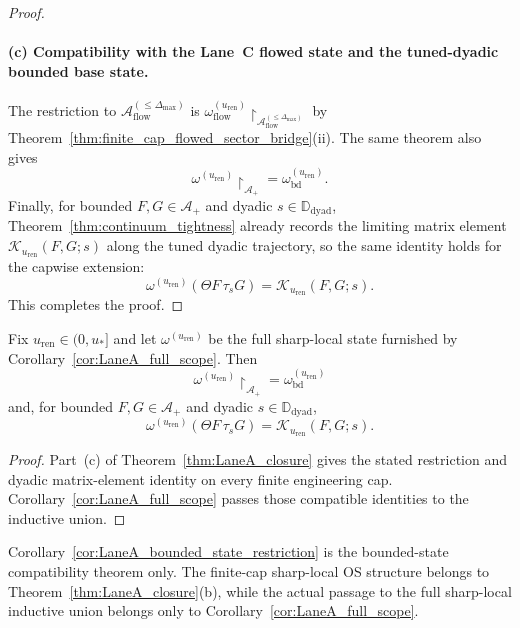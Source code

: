 \begin{proof}
\paragraph{(c) Compatibility with the Lane~C flowed state and the tuned-dyadic bounded base state.}
The restriction to $\mathcal A_{\mathrm{flow}}^{(\le \Delta_{\max})}$ is
$\omega_{\mathrm{flow}}^{(u_{\mathrm{ren}})}\!\restriction_{\mathcal A_{\mathrm{flow}}^{(\le \Delta_{\max})}}$
by Theorem~\ref{thm:finite_cap_flowed_sector_bridge}(ii).
The same theorem also gives
\[
\omega^{(u_{\mathrm{ren}})}\!\restriction_{\mathcal A_+}=\omega_{\mathrm{bd}}^{(u_{\mathrm{ren}})}.
\]
Finally, for bounded $F,G\in\mathcal A_+$ and dyadic $s\in\mathbb D_{\mathrm{dyad}}$, Theorem~\ref{thm:continuum_tightness} already records the limiting matrix element
$\mathcal K_{u_{\mathrm{ren}}}(F,G;s)$ along the tuned dyadic trajectory, so the same identity holds for the capwise extension:
\[
\omega^{(u_{\mathrm{ren}})}(\Theta F\,\tau_s G)=\mathcal K_{u_{\mathrm{ren}}}(F,G;s).
\]
This completes the proof.
\end{proof}

\begin{corollary}\label{cor:LaneA_bounded_state_restriction}
Fix $u_{\mathrm{ren}}\in(0,u_\ast]$ and let $\omega^{(u_{\mathrm{ren}})}$ be the full sharp-local state furnished by Corollary~\ref{cor:LaneA_full_scope}.
Then
\[
\omega^{(u_{\mathrm{ren}})}\!\restriction_{\mathcal A_+}=\omega_{\mathrm{bd}}^{(u_{\mathrm{ren}})}
\]
and, for bounded $F,G\in\mathcal A_+$ and dyadic $s\in\mathbb D_{\mathrm{dyad}}$,
\[
\omega^{(u_{\mathrm{ren}})}(\Theta F\,\tau_s G)=\mathcal K_{u_{\mathrm{ren}}}(F,G;s).
\]
\end{corollary}

\begin{proof}
Part~(c) of Theorem~\ref{thm:LaneA_closure} gives the stated restriction and dyadic matrix-element identity on every finite engineering cap.
Corollary~\ref{cor:LaneA_full_scope} passes those compatible identities to the inductive union.
\end{proof}

\begin{remark}
Corollary~\ref{cor:LaneA_bounded_state_restriction} is the bounded-state compatibility theorem only.
The finite-cap sharp-local OS structure belongs to Theorem~\ref{thm:LaneA_closure}(b), while the actual passage to the full sharp-local inductive union belongs only to Corollary~\ref{cor:LaneA_full_scope}.
\end{remark}


